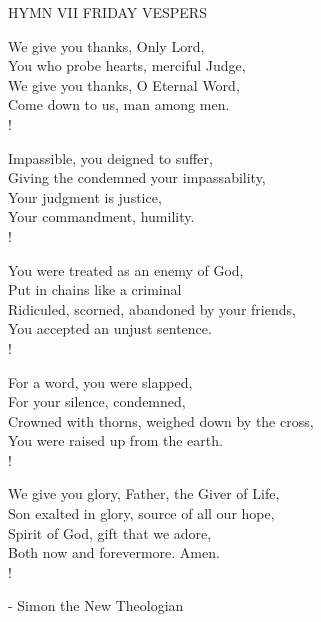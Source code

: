 \noindent\small{\uppercase{Hymn VII Friday Vespers}}\normalsize\label{ordinaryTime:lastHymn}
\begin{cverse}
We give you thanks, Only Lord,\\
You who probe hearts, merciful Judge,\\
We give you thanks, O Eternal Word,\\
Come down to us, man among men.\\!

Impassible, you deigned to suffer,\\
Giving the condemned your impassability,\\
Your judgment is justice,\\
Your commandment, humility.\\!

You were treated as an enemy of God,\\
Put in chains like a criminal\\
Ridiculed, scorned, abandoned by your friends,\\
You accepted an unjust sentence.\\!

For a word, you were slapped,\\
For your silence, condemned,\\
Crowned with thorns, weighed down by the cross,\\
You were raised up from the earth.\\!

We give you glory, Father, the Giver of Life,\\
Son exalted in glory, source of all our hope,\\
Spirit of God, gift that we adore,\\
Both now and forevermore. Amen.\\!
\end{cverse}

\begin{flushright}\tiny - Simon the New Theologian\end{flushright}
